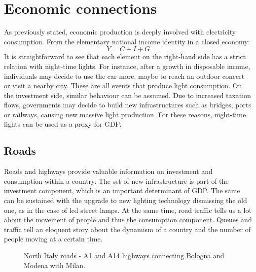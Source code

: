 \section{Economic connections}
As previously stated, economic production is deeply involved with electricity consumption. From the elementary
national income identity in a closed economy:
\begin{equation}
    Y=C+I+G
\end{equation}
It is straightforward to see that each element on the right-hand side has a strict relation with night-time lights. For instance, after a growth in disposable income, individuals may decide to use the car more, maybe to reach an outdoor concert or visit a nearby city. These are all events that produce light consumption.
On the investment side, similar behaviour can be assumed. Due to increased taxation flows, governments may decide to build new infrastructures such as bridges, ports or railways, causing new massive light production. 
For these reasons, night-time lights can be used as a proxy for GDP.
\subsection{Roads}
Roads and highways provide valuable information on investment and consumption within a country. The set of new infrastructure is part of the investment component, which is an important determinant of GDP. The same can be sustained with the upgrade to new lighting technology dismissing the old one, as in the case of led street lamps.
At the same time, road traffic tells us a lot about the movement of people and thus the consumption component. Queues and traffic tell an eloquent story about the dynamism of a country and the number of people moving at a certain time.


\begin{figure}[h!]
    \hspace*{-2.8cm}
    \centering
    \caption{North Italy roads - A1 and A14 highways connecting Bologna and Modena with Milan.}%
    \label{fig:northitalyroads}
\end{figure}


